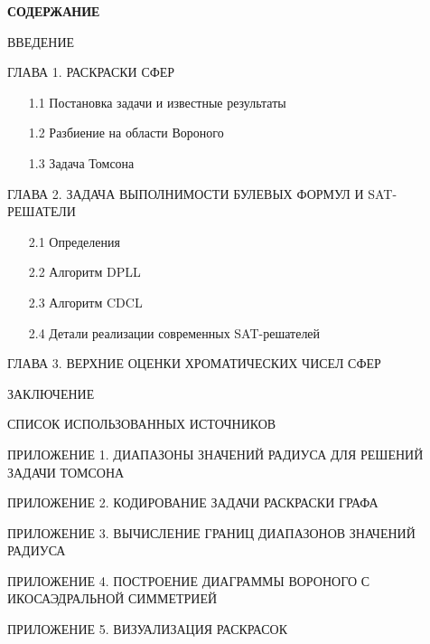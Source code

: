 
\newpage


\begin{center}
\textbf{СОДЕРЖАНИЕ}
\end{center}
\vspace{1.5mm}

\begin{description}

\item{ВВЕДЕНИЕ} \dotfill \pageref{chapters:introduction}

\item{ГЛАВА 1.} РАСКРАСКИ СФЕР \dotfill \pageref{chapters:1}
\begin{enumerate}
\item[1.1] Постановка задачи и известные результаты \dotfill \pageref{chapters:1.1}
\item[1.2] Разбиение на области Вороного \dotfill \pageref{chapters:1.2}
\item[1.3] Задача Томсона \dotfill \pageref{chapters:1.3}
\end{enumerate}

\item{ГЛАВА 2.} ЗАДАЧА ВЫПОЛНИМОСТИ БУЛЕВЫХ ФОРМУЛ И SAT-РЕШАТЕЛИ \dotfill \pageref{chapters:2}
\begin{enumerate}
\item[2.1] Определения \dotfill \pageref{chapters:2.1}
\item[2.2] Алгоритм DPLL \dotfill \pageref{chapters:2.2}
\item[2.3] Алгоритм CDCL \dotfill \pageref{chapters:2.3}
\item[2.4] Детали реализации современных SAT-решателей \dotfill \pageref{chapters:2.4}
\end{enumerate}

\item{ГЛАВА 3.} ВЕРХНИЕ ОЦЕНКИ ХРОМАТИЧЕСКИХ ЧИСЕЛ СФЕР \dotfill \pageref{chapters:3}

\item{ЗАКЛЮЧЕНИЕ} \dotfill \pageref{chapters:conclusions}
\item{СПИСОК ИСПОЛЬЗОВАННЫХ ИСТОЧНИКОВ} \dotfill \pageref{chapters:biblio}

\item{ПРИЛОЖЕНИЕ 1. ДИАПАЗОНЫ ЗНАЧЕНИЙ РАДИУСА ДЛЯ РЕШЕНИЙ ЗАДАЧИ ТОМСОНА} \dotfill \pageref{attachments:1}
\item{ПРИЛОЖЕНИЕ 2. КОДИРОВАНИЕ ЗАДАЧИ РАСКРАСКИ ГРАФА} \dotfill \pageref{attachments:2}
\item{ПРИЛОЖЕНИЕ 3. ВЫЧИСЛЕНИЕ ГРАНИЦ ДИАПАЗОНОВ ЗНАЧЕНИЙ РАДИУСА} \dotfill \pageref{attachments:3}
\item{ПРИЛОЖЕНИЕ 4. ПОСТРОЕНИЕ ДИАГРАММЫ ВОРОНОГО С ИКОСАЭДРАЛЬНОЙ СИММЕТРИЕЙ} \dotfill \pageref{attachments:4}
\item{ПРИЛОЖЕНИЕ 5. ВИЗУАЛИЗАЦИЯ РАСКРАСОК} \dotfill \pageref{attachments:5}

\end{description}
